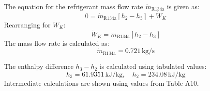 The equation for the refrigerant mass flow rate \( \dot{m}_{\text{R134a}} \) is given as:  
\[
0 = \dot{m}_{\text{R134a}} \left[ h_2 - h_3 \right] + \dot{W}_K
\]  
Rearranging for \( \dot{W}_K \):  
\[
\dot{W}_K = \dot{m}_{\text{R134a}} \left[ h_2 - h_3 \right]
\]  
The mass flow rate is calculated as:  
\[
\dot{m}_{\text{R134a}} = 0.721 \, \text{kg/s}
\]  

The enthalpy difference \( h_3 - h_2 \) is calculated using tabulated values:  
\[
h_3 = 61.9351 \, \text{kJ/kg}, \quad h_2 = 234.08 \, \text{kJ/kg}
\]  
Intermediate calculations are shown using values from Table A10.